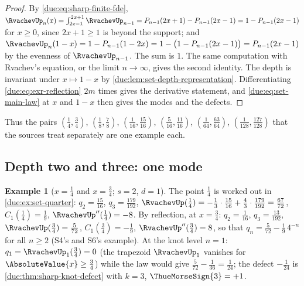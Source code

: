 \documentclass[11pt,oneside]{article}
\theoremstyle{plain}
\theoremstyle{definition}
\newtheorem{example}[theorem]{Example}
\theoremstyle{remark}
\newcommand{\upn}[1]{\RvachevUp_{#1}}
\newcommand{\Cr}[2]{C_{#1}\!\left(#2\right)}                %
\newcommand{\qn}[1]{q_{#1}}                                 %
\begin{document}
\begin{proof}
By \cref{due:eq:sharp-finite-fde}, $\upn{n}(x)=\int_{2x-1}^{2x+1}\upn{n-1}
=P_{n-1}(2x+1)-P_{n-1}(2x-1)=1-P_{n-1}(2x-1)$ for $x\ge0$, since
$2x+1\ge1$ is beyond the support; and
$\upn{n}(1-x)=1-P_{n-1}(1-2x)=1-\bigl(1-P_{n-1}(2x-1)\bigr)=P_{n-1}(2x-1)$
by the evenness of $\upn{n-1}$.  The sum is $1$.  The same computation with
Rvachev's equation, or the limit $n\to\infty$, gives the second identity.
The depth is invariant under $x\mapsto1-x$ by
\cref{due:lem:set-depth-representation}.  Differentiating
\cref{due:eq:exr-reflection} $2m$ times gives the derivative statement,
and \cref{due:eq:set-main-law} at $x$ and $1-x$ then gives the modes and
the defects.
\end{proof}

Thus the pairs $(\tfrac14,\tfrac34)$, $(\tfrac18,\tfrac78)$,
$(\tfrac1{16},\tfrac{15}{16})$, $(\tfrac5{16},\tfrac{11}{16})$,
$(\tfrac1{64},\tfrac{63}{64})$, $(\tfrac1{128},\tfrac{127}{128})$ that the
sources treat separately are one example each.

\subsection{Depth two and three: one mode}
\label{due:sec:exr-one-mode}

\begin{example}[$x=\tfrac14$ and $x=\tfrac34$; $s=2$, $d=1$]
\label{due:ex:exr-quarter}
The point $\tfrac14$ is worked out in \cref{due:ex:set-quarter}:
$\qn{2}=\tfrac{15}{16}$, $\qn{3}=\tfrac{179}{192}$,
$\RvachevUp(\tfrac14)=-\tfrac13\cdot\tfrac{15}{16}+\tfrac43\cdot\tfrac{179}{192}
=\tfrac{67}{72}$, $\Cr{1}{\tfrac14}=\tfrac19$,
$\RvachevUp''(\tfrac14)=-8$.  By reflection, at $x=\tfrac34$:
$\qn{2}=\tfrac1{16}$, $\qn{3}=\tfrac{13}{192}$,
$\RvachevUp(\tfrac34)=\tfrac5{72}$, $\Cr{1}{\tfrac34}=-\tfrac19$,
$\RvachevUp''(\tfrac34)=8$, so that
$\qn{n}=\tfrac5{72}-\tfrac19\,4^{-n}$ for all $n\ge2$ (S4's and S6's
example).  At the knot level $n=1$: $\qn{1}=\upn{1}(\tfrac34)=0$ (the
trapezoid $\upn{1}$ vanishes for $\AbsoluteValue{x}\ge\tfrac34$) while the
law would give $\tfrac5{72}-\tfrac1{36}=\tfrac1{24}$; the defect $-\tfrac1{24}$
is \cref{due:thm:sharp-knot-defect} with $k=3$, $\ThueMorseSign{3}=+1$.
\end{example}
\end{document}
